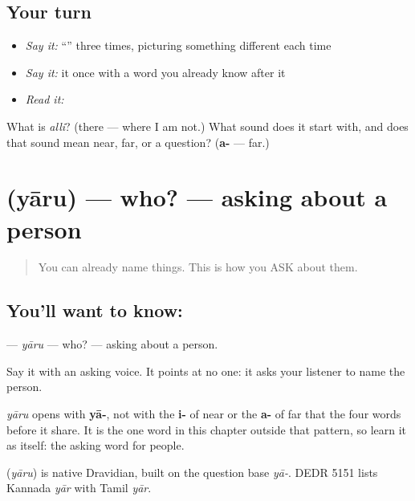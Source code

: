 \subsection*{Your turn}
\begin{itemize}
\raggedright
  \item \emph{Say it:} \textquotedblleft{}\textquotedblright{} three times, picturing something different each time
  \item \emph{Say it:} it once with a word you already know after it
  \item \emph{Read it:} \textbf{}
\end{itemize}

\begin{tcolorbox}[breakable,colback=teal!4,colframe=teal!35!black,title={Before you move on}]
What is \emph{alli}? (there — where I am not.) What sound does it start with, and does that sound mean near, far, or a question? (\textbf{a-} — far.)
\end{tcolorbox}
\section[\texorpdfstring{\kn{ಯಾರು} (yāru)}{ಯಾರು (yāru)}]{ (yāru) — who? — asking about a person}

\label{lesson:KA-C41-who}



\begin{quote}
You can already name things. This is how you ASK about them.
\end{quote}

\subsection*{You'll want to know: }
\textbf{} — \emph{yāru} — who? — asking about a person.

Say it with an asking voice. It points at no one: it asks your listener to name the person.

\emph{yāru} opens with \textbf{yā-}, not with the \textbf{i-} of near or the \textbf{a-} of far that the four words before it share. It is the one word in this chapter outside that pattern, so learn it as itself: the asking word for people.

\begin{cousinweb}
\textbf{} (\emph{yāru}) is native Dravidian, built on the question base \emph{yā-}. DEDR 5151 lists Kannada \emph{yār} with Tamil \emph{yār}.
\end{cousinweb}

